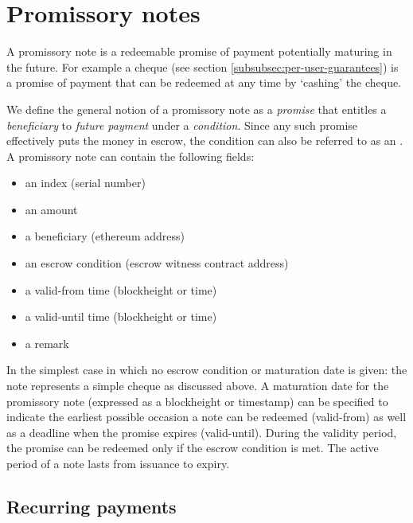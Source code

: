 \section{Promissory notes}

A promissory note is a redeemable promise of payment potentially maturing in the future. For example a cheque (see section \ref{subsubsec:per-user-guarantees}) is a promise of payment that can be redeemed at any time by `cashing' the cheque. 

We define the general notion of a promissory note as a \emph{promise} that entitles a \emph{beneficiary} to \emph{future payment} under a \emph{condition}. Since any such promise effectively puts the money in escrow, the condition can also be referred to as an  . A promissory note can contain the following fields:

  \begin{itemize}
    \item an index (serial number)
    \item an amount
    \item a beneficiary (ethereum address)
    \item an escrow condition (escrow witness contract address)
    \item a valid-from time (blockheight or time)
    \item a valid-until time (blockheight or time)
    \item a remark
  \end{itemize}

In the simplest case in which no escrow condition or maturation date is given: the note represents a simple cheque as discussed above.
A maturation date for the promissory note (expressed as a blockheight or timestamp) can be specified to indicate the earliest possible occasion a note can be redeemed (valid-from) as well as a deadline when the promise expires (valid-until).
During the validity period, the promise can be redeemed only if the escrow condition is met. The active period of a note lasts from issuance to expiry.

\subsection{Recurring payments}

